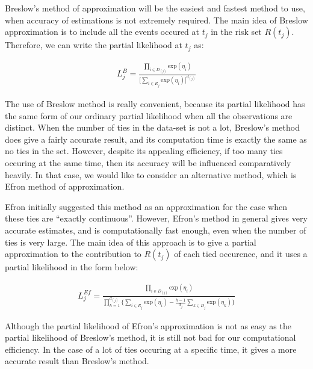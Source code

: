 \documentclass[]{article}
\begin{document}
Breslow's method of approximation will be the easiest and fastest method
to use, when accuracy of estimations is not extremely required. The main
idea of Breslow approximation is to include all the events occured at
\(t_j\) in the risk set \(R(t_j)\). Therefore, we can write the partial
likelihood at \(t_j\) as:

\begin{equation}\begin{aligned}\label{eqn:tie1forBres}
L_j^B = \frac{\prod_{i \in D_{(j)}} \text{exp}(\eta_i)}{\big[ \sum_{i\in R_{j}} \text{exp}(\eta_i) \big]^{d_{(j)}}}
\end{aligned}\end{equation}

The use of Breslow method is really convenient, because its partial
likelihood has the same form of our ordinary partial likelihood when all
the observations are distinct. When the number of ties in the data-set
is not a lot, Breslow's method does give a fairly accurate result, and
its computation time is exactly the same as no ties in the set. However,
despite its appealing efficiency, if too many ties occuring at the same
time, then its accuracy will be influenced comparatively heavily. In
that case, we would like to consider an alternative method, which is
Efron method of approximation.

Efron initially suggested this method as an approximation for the case
when these ties are ``exactly continuous''. However, Efron's method in
general gives very accurate estimates, and is computationally fast
enough, even when the number of ties is very large. The main idea of
this approach is to give a partial approximation to the contribution to
\(R(t_j)\) of each tied occurence, and it uses a partial likelihood in
the form below:

\begin{equation}\begin{aligned}\label{eqn:tie1forEf}
L_j^{Ef} = \frac{\prod_{i \in D_{(j)}} \text{exp}(\eta_i)}{\prod_{h = 1}^{d_{(j)}} \bigg \{\sum_{i\in R_{j}} \text{exp}(\eta_i) - \frac{h-1}{d_j}\sum_{k\in D_{j}} \text{exp}(\eta_k) \bigg \}}
\end{aligned}\end{equation}

Although the partial likelihood of Efron's approximation is not as easy
as the partial likelihood of Breslow's method, it is still not bad for
our computational efficiency. In the case of a lot of ties occuring at a
specific time, it gives a more accurate result than Breslow's method.
\end{document}
